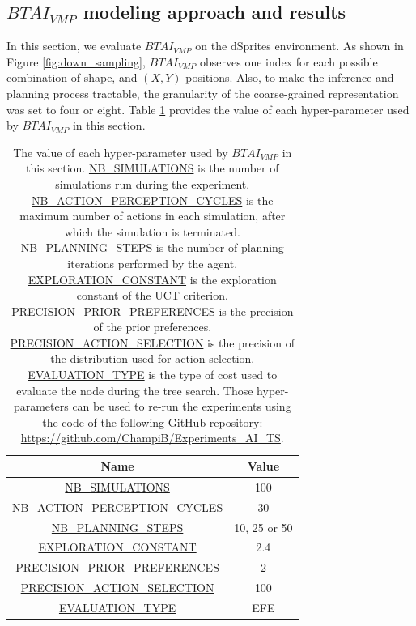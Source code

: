 \documentclass[twoside,11pt]{article}
\begin{document}
\subsection{$BTAI_{VMP}$ modeling approach and results} \label{ssec:btai_vmp}

In this section, we evaluate $BTAI_{VMP}$ \citep{AITS_THEORY,AITS_PRACTICE} on the dSprites environment. As shown in Figure \ref{fig:down_sampling}, $BTAI_{VMP}$ observes one index for each possible combination of shape, and $(X, Y)$ positions. Also, to make the inference and planning process tractable, the granularity of the coarse-grained representation was set to four or eight. Table \ref{tab:values_hp_BTAI_dSprites} provides the value of each hyper-parameter used by $BTAI_{VMP}$ in this section.

\begin{table}[H]
\centering
\begin{tabular}{ |c|c|  }
 \hline
 Name & Value\\
 \hline
 \hline
 \url{NB_SIMULATIONS} & 100\\
 \hline
 \url{NB_ACTION_PERCEPTION_CYCLES} & 30\\
 \hline
 \url{NB_PLANNING_STEPS} & 10, 25 or 50\\
 \hline
 \url{EXPLORATION_CONSTANT} & 2.4\\
 \hline
 \url{PRECISION_PRIOR_PREFERENCES} & 2\\
 \hline
 \url{PRECISION_ACTION_SELECTION} & 100\\
 \hline
 \url{EVALUATION_TYPE} & EFE\\
 \hline
\end{tabular}
\caption{The value of each hyper-parameter used by $BTAI_{VMP}$ in this section. \url{NB_SIMULATIONS} is the number of simulations run during the experiment. \url{NB_ACTION_PERCEPTION_CYCLES} is the maximum number of actions in each simulation, after which the simulation is terminated. \url{NB_PLANNING_STEPS} is the number of planning iterations performed by the agent. \url{EXPLORATION_CONSTANT} is the exploration constant of the UCT criterion. \url{PRECISION_PRIOR_PREFERENCES} is the precision of the prior preferences. \url{PRECISION_ACTION_SELECTION} is the precision of the distribution used for action selection. \url{EVALUATION_TYPE} is the type of cost used to evaluate the node during the tree search. Those hyper-parameters can be used to re-run the experiments using the code of the following GitHub repository: \url{https://github.com/ChampiB/Experiments_AI_TS}.}
\label{tab:values_hp_BTAI_dSprites}
\end{table}
\end{document}
